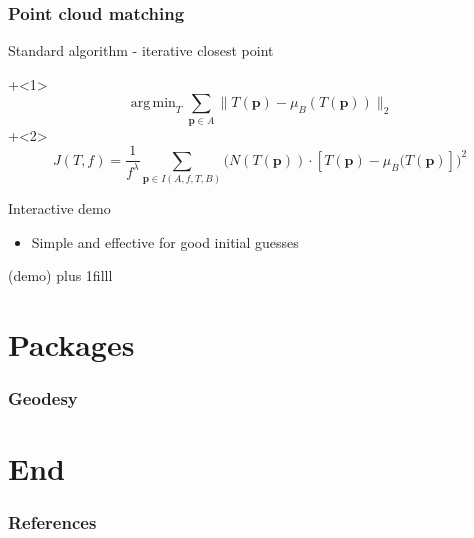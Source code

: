 \documentclass{beamer}
\newcommand{\vf}[1]{\vskip0pt plus #1}
\renewcommand{\v}[1]{\mathbf{#1}} %
\newcommand{\norm}[2][]{#1\lVert #2 #1\rVert}
\DeclareMathOperator*{\argmin}{arg\,min}
\begin{document}
\begin{frame}
  \frametitle{Point cloud matching}
  Standard algorithm - iterative closest point

  \onslide+<1>
  \[
    \argmin_T \sum_{\v{p}\in A} \norm[\big]{ T(\v{p}) - \mu_B(T(\v{p}))}_2
  \]
\onslide+<2>
\[
J(T, f) = \frac{1}{f^\lambda} \sum_{\v{p} \in I(A,f,T,B)}
            \Big(
              N(T(\v{p})) \cdot \left[T(\v{p}) - \mu_B(T(\v{p})\right]
            \Big)^2
\]

  Interactive demo

  \begin{itemize}
    \item  Simple and effective for good initial guesses
  \end{itemize}
  (demo)
  \vf{1filll}
\end{frame}



\section{Packages}

\begin{frame}
  \frametitle{Geodesy}
\end{frame}





\section*{End}


\begin{frame}
  \frametitle{References}
  \normalsize
\end{frame}



%
%  


\end{document}
